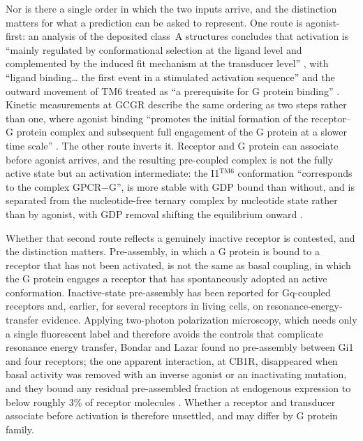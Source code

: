 Nor is there a single order in which the two inputs arrive, and the distinction matters for what a
prediction can be asked to represent. One route is agonist-first: an analysis of the deposited
class~A structures concludes that activation is ``mainly regulated by conformational selection at
the ligand level and complemented by the induced fit mechanism at the transducer level''
\citep[p.~3]{paajanen2026activation}, with ``ligand binding\ldots{} the first event in a stimulated
activation sequence'' and the outward movement of TM6 treated as ``a prerequisite for G protein
binding'' \citep[pp.~3, 6]{paajanen2026activation}. Kinetic measurements at GCGR describe the same
ordering as two steps rather than one, where agonist binding ``promotes the initial formation of the
receptor--G protein complex and subsequent full engagement of the G protein at a slower time scale''
\citep[p.~1]{hilger2020gcgr}. The other route inverts it. Receptor and G protein can associate
before agonist arrives, and the resulting pre-coupled complex is not the fully active state but an
activation intermediate: the I1$^{\mathrm{TM6}}$ conformation ``corresponds to the complex
GPCR$-$G'', is more stable with GDP bound than without, and is separated from the nucleotide-free
ternary complex by nucleotide state rather than by agonist, with GDP removal shifting the
equilibrium onward \citep[pp.~10--12, 19]{georgiou2025heterogeneity}.

Whether that second route reflects a genuinely inactive receptor is contested, and the distinction
matters. Pre-assembly, in which a G protein is bound to a receptor that has not been activated, is
not the same as basal coupling, in which the G protein engages a receptor that has spontaneously
adopted an active conformation. Inactive-state pre-assembly has been reported for Gq-coupled receptors and, earlier, for several
receptors in living cells, on resonance-energy-transfer evidence. Applying two-photon polarization
microscopy, which
needs only a single fluorescent label and therefore avoids the controls that complicate resonance
energy transfer, Bondar and Lazar found no pre-assembly between Gi1 and four receptors; the one
apparent interaction, at CB1R, disappeared when basal activity was removed with an inverse agonist
or an inactivating mutation, and they bound any residual pre-assembled fraction at endogenous
expression to below roughly 3\% of receptor molecules \citep{bondar2017preassembly}. Whether a
receptor and transducer associate before activation is therefore unsettled, and may differ by G
protein family.

